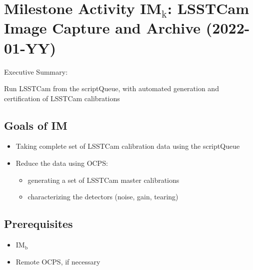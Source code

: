 \section{Milestone Activity IM\(_{\text{k}}\): LSSTCam Image Capture and Archive   (2022-01-YY)}
\label{sec:orgbcbe57f}

Executive Summary:

Run LSSTCam from the scriptQueue, with automated generation and certification of LSSTCam calibrations

\subsection{Goals of IM}
\begin{itemize}
\item Taking complete set of LSSTCam calibration data using the scriptQueue
\item Reduce the data using \gls{OCPS}:
  \begin{itemize}
  \item generating a set of LSSTCam master calibrations
  \item characterizing the detectors (noise, gain, tearing)
  \end{itemize}
\end{itemize}
\subsection{Prerequisites}

\begin{itemize}
\item{IM\(_{\text{b}}\)}
\item{Remote \gls{OCPS}, if necessary}
\end{itemize}

